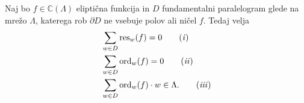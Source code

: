 \documentclass[mat1]{fmfdelo}
\numberwithin{equation}{section}
\newcommand{\C}{\mathbb C}
\newcommand{\res}[2]{\operatorname{res}_{#1}(#2)}
\newcommand{\ord}[2]{\operatorname{ord}_{#1}(#2)}
\theoremstyle{definition}
\begin{document}
\begin{izrek}
    \label{liouville}
    Naj bo $f \in \C(\Lambda)$ eliptična funkcija in $D$ fundamentalni paralelogram glede na mrežo $\Lambda$, katerega rob $\partial D$ ne vsebuje polov ali ničel $f$. Tedaj velja
    \begin{align}
        &\sum_{w \in D} \res{w}{f} = 0  \label{eq: identiteta 1} 
        \tag{\emph{i}}
        \\ 
        &\sum_{w \in D} \ord{w}{f} = 0  \label{eq: identiteta 2}
        \tag{\emph{ii}} 
        \\
        &\sum_{w \in D} \ord{w}{f}\cdot w \in \Lambda.  \label{eq: identiteta 3} 
        \tag{\emph{iii}}
    \end{align}

\end{izrek}
\end{document}
